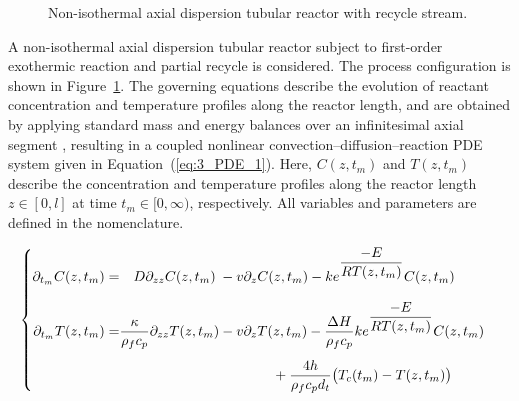 \begin{figure}[!htbp]
    \caption{Non-isothermal axial dispersion tubular reactor with recycle stream.}
    \label{fig:3_reactor_scheme}
\end{figure}


A non-isothermal axial dispersion tubular reactor subject to first-order exothermic reaction and partial recycle is considered. The process configuration is shown in Figure~\ref{fig:3_reactor_scheme}. The governing equations describe the evolution of reactant concentration and temperature profiles along the reactor length, and are obtained by applying standard mass and energy balances over an infinitesimal axial segment \autocite{levenspiel1998chemical}, resulting in a coupled nonlinear convection--diffusion--reaction PDE system given in Equation~(\ref{eq:3_PDE_1}). Here, $C(z, t_m)$ and $T(z, t_m)$ describe the concentration and temperature profiles along the reactor length $z \in [0, l]$ at time $t_m \in [0, \infty)$, respectively. All variables and parameters are defined in the nomenclature.

\begin{equation} \label{eq:3_PDE_1}
\begin{cases}
\begin{alignedat}{2}
    \partial_{t_m} C(z, t_m) = &\hspace{1em} D \partial_{zz} C(z, t_m)              &&- v \partial_{z} C(z, t_m) -                              k e^{\dfrac{-E}{R T(z, t_m)}} C(z, t_m)\\[2.0ex]
    \partial_{t_m} T(z, t_m) = &\dfrac{\kappa}{\rho_f c_p} \partial_{zz} T(z, t_m) &&- v \partial_{z} T(z, t_m) - \dfrac{\Delta H}{\rho_f c_p} k e^{\dfrac{-E}{R T(z, t_m)}} C(z, t_m)\\[1.2ex]
    &&& \hspace{3.8em} + \dfrac{4h}{\rho_f c_p d_t} \bigl( T_c(t_m) - T(z, t_m) \bigr) \\
\end{alignedat}
\end{cases}
\end{equation}

